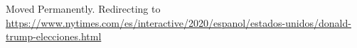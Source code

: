 Moved Permanently. Redirecting to
\url{https://www.nytimes.com/es/interactive/2020/espanol/estados-unidos/donald-trump-elecciones.html}
